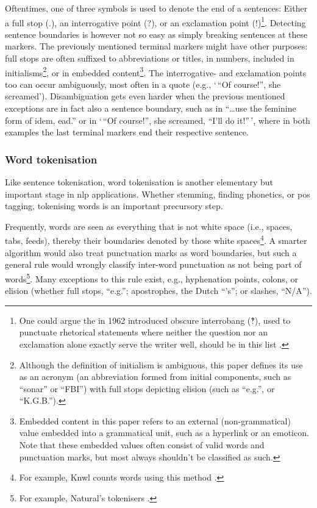 Oftentimes, one of three symbols is used to denote the end of a
sentences: Either a full stop (.), an interrogative point (?), or an
exclamation point (!)\footnote{One could argue the in 1962 introduced
  obscure interrobang (‽), used to punctuate rhetorical statements where
  neither the question nor an exclamation alone exactly serve the writer
  well, should be in this list \autocite{interrobang-mks.com}.}.
Detecting sentence boundaries is however not so easy as simply breaking
sentences at these markers. The previously mentioned terminal markers
might have other purposes: full stops are often suffixed to
abbreviations or titles, in numbers, included in initialisms\footnote{Although
  the definition of initialism is ambiguous, this paper defines its use
  as an acronym (an abbreviation formed from initial components, such as
  ``sonar'' or ``FBI'') with full stops depicting elision (such as
  ``e.g.'', or ``K.G.B.'').}, or in embedded content\footnote{Embedded
  content in this paper refers to an external (non-grammatical) value
  embedded into a grammatical unit, such as a hyperlink or an emoticon.
  Note that these embedded values often consist of valid words and
  punctuation marks, but most always shouldn't be classified as such.}.
The interrogative- and exclamation points too can occur ambiguously,
most often in a quote (e.g., `\,``Of course!'', she screamed').
Disambiguation gets even harder when the previous mentioned exceptions
are in fact also a sentence boundary, such as in ``\ldots{}use the
feminine form of idem, ead.'' or in `\,``Of course!'', she screamed,
``I'll do it!''\,', where in both examples the last terminal markers end
their respective sentence.

\subsubsection{Word tokenisation}\label{word-tokenisation}

Like sentence tokenisation, word tokenisation is another elementary but
important stage in \gls{nlp} applications. Whether stemming, finding
phonetics, or \gls{pos} tagging, tokenising words is an important
precursory step.

Frequently, words are seen as everything that is not white space (i.e.,
spaces, tabs, feeds), thereby their boundaries denoted by those white
spaces\footnote{For example, Knwl counts words using this method
  \autocite{loadfive/knwl-source-code}.}. A smarter algorithm would also
treat punctuation marks as word boundaries, but such a general rule
would wrongly classify inter-word punctuation as not being part of
words\footnote{For example, Natural's tokenisers
  \autocite{NaturalNode/natural-source-code}.}. Many exceptions to this
rule exist, e.g., hyphenation points, colons, or elision (whether full
stops, ``e.g.''; apostrophes, the Dutch ``'s''; or slashes, ``N\slash A'').

